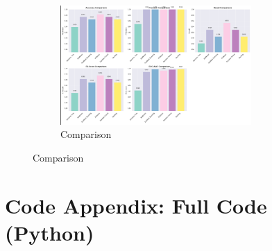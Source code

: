 \documentclass[11pt]{article}
\begin{document}
\begin{figure}[H]
\begin{figure}[H]
\centering
\includegraphics[width=0.8\textwidth]{E.png}
\caption{Comparison}
\end{figure}

\end{figure}

\newpage

\section{Code Appendix: Full Code (Python)}
\end{document}
